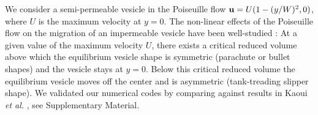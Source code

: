 \documentclass[9pt,twocolumn,twoside,lineno]{pnas-new}
\begin{document}
We consider a semi-permeable vesicle in the Poiseuille flow $\mathbf{u} =
U(1-(y/W)^2,0)$, where $U$ is the maximum velocity at $y=0$. The non-linear effects of the Poiseuille flow
on the migration of an impermeable vesicle have been well-studied \cite{kao-bir-mis2009}: At a given value of the maximum velocity $U$,
there exists a critical reduced volume above which the equilibrium vesicle shape is symmetric (parachute or bullet shapes) and the vesicle stays at $y=0$.
Below this critical reduced volume the equilibrium vesicle moves off the center and is asymmetric (tank-treading slipper shape).
We validated our numerical codes by comparing against results in Kaoui {\it et al.} \cite{kao-bir-mis2009}, see Supplementary Material.

%
%
%
%
%
%
\end{document}
